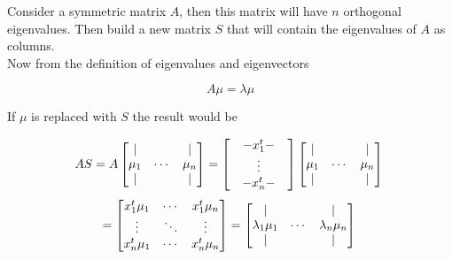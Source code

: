 \documentclass[12pt,journal]{IEEEtran}
\begin{document}
    Consider a symmetric matrix $A$, then this matrix will have $n$ orthogonal
    eigenvalues. Then build a new matrix $S$ that will contain the eigenvalues of
    $A$ as columns.\\

    Now from the definition of eigenvalues and eigenvectors

    \begin{equation*}
        A \mu = \lambda \mu
    \end{equation*}

    If $\mu$ is replaced with $S$ the result would be

    \[
        A S = A 
        \begin{bmatrix}
              |   &        &   |  \\
            \mu_1 & \cdots & \mu_n\\
              |   &        &   |  \\
        \end{bmatrix}
        =
        \begin{bmatrix}
             & - x_1^t - &\\
             &  \vdots   &\\
             & - x_n^t - &\\
        \end{bmatrix}
        \begin{bmatrix}
              |   &        &   |  \\
            \mu_1 & \cdots & \mu_n\\
              |   &        &   |  \\
        \end{bmatrix}\\
    \]
    \[
        =
        \begin{bmatrix}
            x_1^t \mu_1 & \cdots & x_1^t \mu_n\\
               \vdots   & \ddots &   \vdots   \\
            x_n^t \mu_1 & \cdots & x_n^t \mu_n\\
        \end{bmatrix}
        =
        \begin{bmatrix}
                    |       &        &         |      \\
            \lambda_1 \mu_1 & \cdots & \lambda_n \mu_n\\
                    |       &        &         |      \\
        \end{bmatrix}\\
    \]
\end{document}
